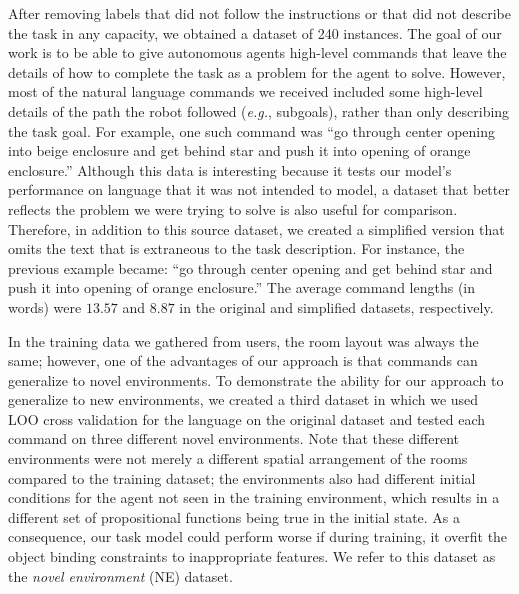 \documentclass[conference]{IEEEtran}
\begin{document}
After removing labels that did not follow the instructions or that did not describe the task in any capacity, we obtained a dataset of 240 instances. The goal of our work is to be able to give autonomous agents high-level commands that leave the details of how to complete the task as a problem for the agent to solve. However, most of the natural language commands we received included some high-level details of the path the robot followed (\emph{e.g.}, subgoals), rather than only describing the task goal. 
For example, one such command was ``go through center opening into beige enclosure and get behind star and push it into opening of orange enclosure.'' 
Although this data is interesting because it tests our model's performance on language that it was not intended to model, a dataset that better reflects the problem we were trying to solve is also useful for comparison. Therefore, in addition to this source dataset, we  created a simplified version that omits the text that is extraneous to the task description. 
For instance, the previous example became: ``go through center opening and get behind star and push it into opening of orange enclosure.'' 
The average command lengths (in words) were $13.57$ and $8.87$ in the original and simplified datasets, respectively.

In the training data we gathered from users, the room layout was always the same; however, one of the advantages of our approach is that commands can generalize to novel environments. To demonstrate the ability for our approach to generalize to new environments, we created a third dataset in which we used LOO cross validation for the language on the original dataset and tested each command on three different novel environments. Note that these different environments were not merely a different spatial arrangement of the rooms compared to the training dataset; the environments also had different initial conditions for the agent not seen in the training environment, which results in a different set of propositional functions being true in the initial state. As a consequence, our task model could perform worse if during training, it overfit the object binding constraints to inappropriate features. We refer to this dataset as the {\em novel environment} (NE) dataset.


\end{document}
